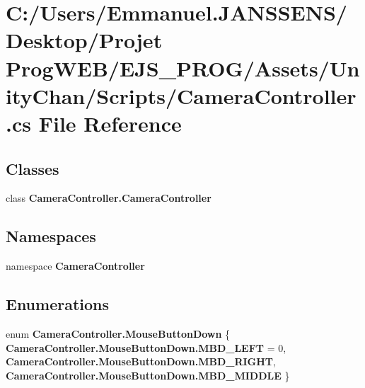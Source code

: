 \section{C\+:/\+Users/\+Emmanuel.J\+A\+N\+S\+S\+E\+N\+S/\+Desktop/\+Projet Prog\+W\+E\+B/\+E\+J\+S\+\_\+\+P\+R\+O\+G/\+Assets/\+Unity\+Chan/\+Scripts/\+Camera\+Controller.cs File Reference}
\label{_camera_controller_8cs}
\subsection*{Classes}
\begin{DoxyCompactItemize}
\item 
class \textbf{ Camera\+Controller.\+Camera\+Controller}
\end{DoxyCompactItemize}
\subsection*{Namespaces}
\begin{DoxyCompactItemize}
\item 
namespace \textbf{ Camera\+Controller}
\end{DoxyCompactItemize}
\subsection*{Enumerations}
\begin{DoxyCompactItemize}
\item 
enum \textbf{ Camera\+Controller.\+Mouse\+Button\+Down} \{ \textbf{ Camera\+Controller.\+Mouse\+Button\+Down.\+M\+B\+D\+\_\+\+L\+E\+FT} = 0, 
\textbf{ Camera\+Controller.\+Mouse\+Button\+Down.\+M\+B\+D\+\_\+\+R\+I\+G\+HT}, 
\textbf{ Camera\+Controller.\+Mouse\+Button\+Down.\+M\+B\+D\+\_\+\+M\+I\+D\+D\+LE}
 \}
\end{DoxyCompactItemize}
